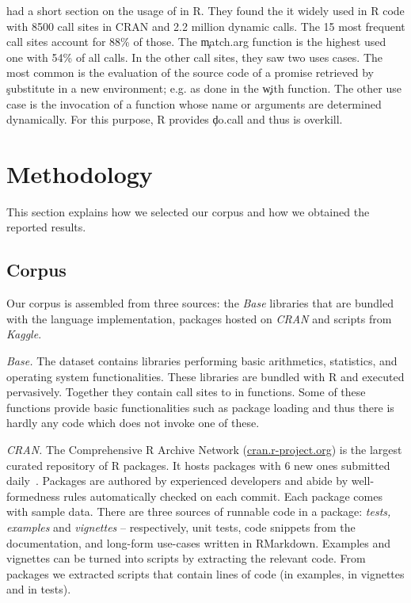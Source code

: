 \documentclass[screen,acmsmall]{acmart}
\newcommand{\mypara}[1]{\medskip\noindent\emph{#1}\xspace}
\begin{document}
\citet{ecoop12} had a short section on the usage of \eval in R. They found the
it widely used in R code with 8500 call sites in CRAN and 2.2 million dynamic
calls. The 15 most frequent call sites account for 88\% of those. The
\c{match.arg} function is the highest used one with 54\% of all calls. In the
other call sites, they saw two uses cases. The most common is the evaluation of
the source code of a promise retrieved by \c{substitute} in a new environment;
e.g. as done in the \c{with} function. The other use case is the invocation of a
function whose name or arguments are determined dynamically. For this purpose, R
provides \c{do.call} and thus \eval is overkill.


\newpage
\section{Methodology}

This section explains how we selected our corpus and how we obtained the
reported results.

\subsection{Corpus}

Our corpus is assembled from three sources: the \emph{Base} libraries that are
bundled with the language implementation, packages hosted on \emph{CRAN} and
scripts from \emph{Kaggle}.

\mypara{Base.} The dataset contains \BasePackages libraries performing basic
arithmetics, statistics, and operating system functionalities. These libraries
are bundled with R and executed pervasively. Together they contain
\BaseEvalCallSites call sites to \eval in \BaseFunsWithEvals functions. Some of these
functions provide basic functionalities such as package loading and thus there
is hardly any code which does not invoke one of these.

\mypara{CRAN.} The Comprehensive R Archive Network
(\small{\url{cran.r-project.org}}) is the largest curated repository of R
packages. It hosts \CranAvailablePackagesRnd packages with 6 new ones submitted
daily~\cite{Ligges2017}. Packages are authored by experienced developers and
abide by well-formedness rules automatically checked on each commit.
Each package comes with sample data. There are three sources of
runnable code in a package: \emph{tests, examples} and \emph{vignettes} --
respectively, unit tests, code snippets from the documentation, and long-form
use-cases written in RMarkdown. Examples and vignettes can be turned into
scripts by extracting the relevant code. From \CranPackages packages we
extracted \CranRunnableScripts scripts that contain \CranRunnableCode lines of
code (\CranRunnableCodeExamplesRnd in examples, \CranRunnableCodeVignettesRnd in
vignettes and \CranRunnableCodeTestsRnd in tests).
\end{document}
